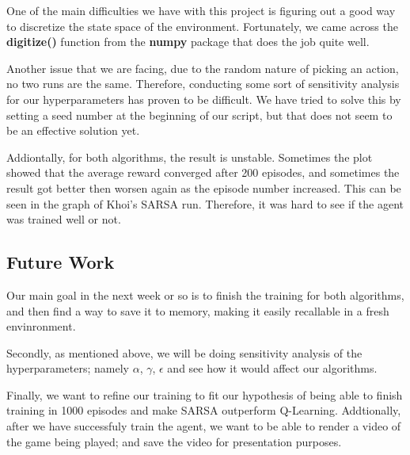 \documentclass[nohyperref]{article}
\theoremstyle{plain}
\theoremstyle{definition}
\theoremstyle{remark}
\newcommand{\cnote}[1]{\textsf{\color{blue} [#1]}}
\begin{document}
One of the main difficulties we have with this project is figuring out a good way to discretize the state space of the environment.
Fortunately, we came across the \textbf{digitize()} function from the \textbf{numpy} package that does the job quite well.

Another issue that we are facing, due to the random nature of picking an action, no two runs are the same. Therefore, conducting some sort of
sensitivity analysis for our hyperparameters has proven to be difficult. We have tried to solve this by setting a seed number at the beginning
of our script, but that does not seem to be an effective solution yet.

Addiontally, for both algorithms, the result is unstable. Sometimes the plot showed that the average reward converged after 200 episodes, 
and sometimes the result got better then worsen again as the episode number increased. This can be seen in the graph of Khoi's SARSA run.
Therefore, it was hard to see if the agent was trained well or not.

\subsection*{Future Work}

Our main goal in the next week or so is to finish the training for both algorithms, and then find a way to save it to memory, making it easily recallable in a fresh envinronment.

Secondly, as mentioned above, we will be doing sensitivity analysis of the hyperparameters; namely $\alpha$, $\gamma$, $\epsilon$ and see how it would
affect our algorithms.

Finally, we want to refine our training to fit our hypothesis of being able to finish training in 1000 episodes and make SARSA outperform Q-Learning.
Addtionally, after we have successfuly train the agent, we want to be able to render a video of the game being played; and save the video for presentation purposes.



\end{document}
